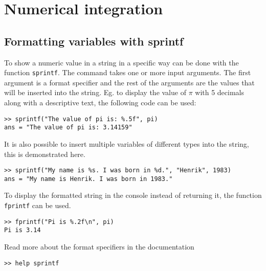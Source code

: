 \section{Numerical integration}



\subsection{Formatting variables with sprintf}

To show a numeric value in a string in a specific way can be 
done with the function \verb!sprintf!.
The command takes one or more input arguments.
The first argument is a format specifier and the rest
of the arguments are the values that will be inserted 
into the string.
Eg. to display the value of $\pi$ with 5 decimals
along with a descriptive text, the following code 
can be used:
\begin{lstlisting}
>> sprintf("The value of pi is: %.5f", pi)
ans = "The value of pi is: 3.14159"
\end{lstlisting}
It is also possible to insert multiple variables
of different types into the string, this is demonstrated 
here.
\begin{lstlisting}
>> sprintf("My name is %s. I was born in %d.", "Henrik", 1983)
ans = "My name is Henrik. I was born in 1983."
\end{lstlisting}
To display the formatted string in the console
instead of returning it, the function
\verb!fprintf! can be used.
\begin{lstlisting}
>> fprintf("Pi is %.2f\n", pi)
Pi is 3.14
\end{lstlisting}
Read more about the format specifiers in the documentation
\begin{lstlisting}
>> help sprintf
\end{lstlisting}





